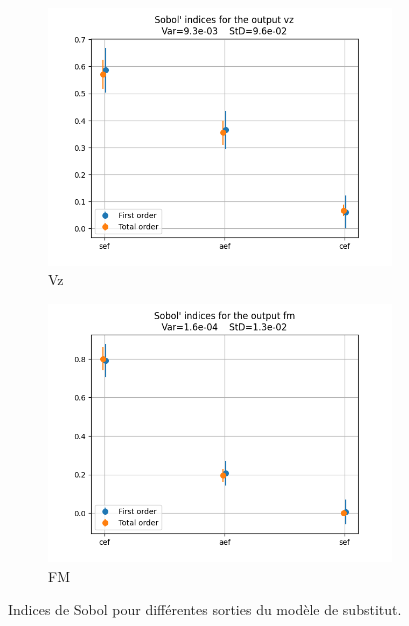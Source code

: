\documentclass[a4paper, 11pt]{article}
\begin{document}
\begin{figure}[H]
    \vspace{10pt} %

    \begin{subfigure}[b]{0.45\textwidth}
        \includegraphics[width=\textwidth]{Images_Ayoub/Problem2/X_opt/Sobol_Indices/vz.png}
        \caption{Vz}
        \label{fig:vz}
    \end{subfigure}
    \hfill
    \begin{subfigure}[b]{0.45\textwidth}
        \includegraphics[width=\textwidth]{Images_Ayoub/Problem2/X_opt/Sobol_Indices/fm.png}
        \caption{FM}
        \label{fig:fm}
    \end{subfigure}

    \caption{Indices de Sobol pour différentes sorties du modèle de substitut.}
    \label{fig:sobol_indices}
\end{figure}
\end{document}
